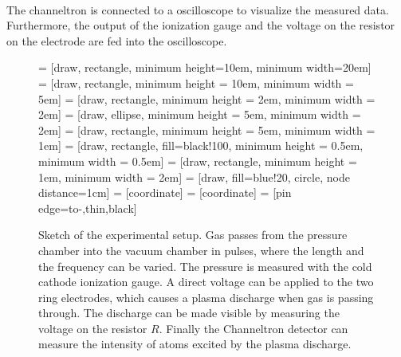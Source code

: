 \documentclass[a4paper,10pt]{article}
\begin{document}
\\
The channeltron is connected to a oscilloscope to visualize the measured data. Furthermore, the output of the ionization gauge and the voltage on the resistor on the electrode are fed into the oscilloscope.
\begin{figure}[htp!]
    \centering
     = [draw, rectangle,
    minimum height=10em, minimum width=20em]
     = [draw, rectangle, minimum height = 10em, minimum width = 5em]
     = [draw, rectangle, minimum height = 2em, minimum width = 2em]
     = [draw, ellipse, minimum height = 5em, minimum width = 2em]
     = [draw, rectangle, minimum height = 5em, minimum width = 1em]
     = [draw, rectangle, fill=black!100, minimum height = 0.5em, minimum width = 0.5em]
     = [draw, rectangle, minimum height = 1em, minimum width = 2em]
     = [draw, fill=blue!20, circle, node distance=1cm]
     = [coordinate]
     = [coordinate]
     = [pin edge={to-,thin,black}]

\caption{Sketch of the experimental setup. Gas passes from the pressure chamber into the vacuum chamber in pulses, where the length and the frequency can be varied. The pressure is measured with the cold cathode ionization gauge. A direct voltage can be applied to the two ring electrodes, which causes a plasma discharge when gas is passing through. The discharge can be made visible by measuring the voltage on the resistor $R$. Finally the Channeltron detector can measure the intensity of atoms excited by the plasma discharge. }
\label{fig_setup}
\end{figure}
\end{document}
